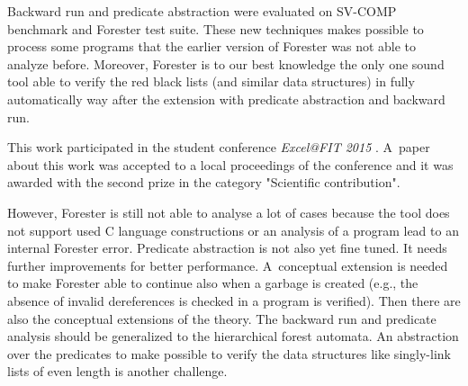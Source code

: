 Backward run and predicate abstraction were evaluated on SV-COMP benchmark and
Forester test suite.
These new techniques makes possible to process some programs that the earlier version
of Forester was not able to analyze before.
Moreover, Forester is to our best knowledge the only one sound tool
able to verify the red black lists (and similar data structures)
in fully automatically way after the extension with predicate abstraction and backward run.

This work participated in the student conference \emph{Excel@FIT 2015} \cite{www:excel}.
A~paper about this work was accepted to a local proceedings of the conference
and it was awarded with the second prize in the category "Scientific contribution".

However, Forester is still not able to analyse a lot of cases
because the tool does not support used C language constructions
or an analysis of a program lead to an internal Forester error.
Predicate abstraction is not also yet fine tuned.
It needs further improvements for better performance.
A~conceptual extension is needed to make Forester able to continue also
when a garbage is created (e.g., the absence of invalid
dereferences is checked in a program is verified).
Then there are also the conceptual extensions of the theory.
The backward run and predicate analysis should be generalized
to the hierarchical forest automata.
An abstraction over the predicates to make possible to verify
the data structures like singly-link lists of even length is
another challenge.
